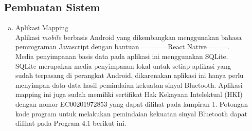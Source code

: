 \begin{enumerate}[a.]



\subsection{Pembuatan Sistem}

\begin{enumerate}[a.]
	\item Aplikasi Mapping
	      \\ Aplikasi \textit{mobile} berbasis Android yang dikembangkan menggunakan bahasa pemrograman Javascript dengan bantuan =====React Native====. Media penyimpanan basis data pada aplikasi ini menggunakan SQLite. SQLite merupakan media penyimpanan lokal untuk setiap aplikasi yang sudah terpasang di perangkat Android, dikarenakan aplikasi ini hanya perlu menyimpan data-data hasil pemindaian kekuatan sinyal Bluetooth. Aplikasi mapping ini juga sudah memiliki sertifikat Hak Kekayaan Intelektual (HKI) dengan nomor EC00201972853 yang dapat dilihat pada lampiran 1. Potongan kode program untuk melakukan pemindaian kekuatan sinyal Bluetooth dapat dilihat pada Program 4.1 berikut ini.
	      \vspace{0.4cm}


\end{enumerate}
\end{enumerate}
